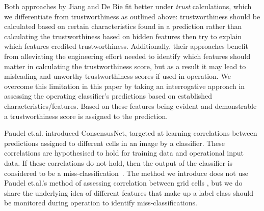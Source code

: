 Both approaches by Jiang and De Bie fit better under \textit{trust} calculations, which we differentiate from trustworthiness as outlined above: trustworthiness should be calculated based on certain characteristics found in a prediction rather than calculating the trustworthiness based on hidden features then try to explain which features credited trustworthiness. 
%
Additionally, their approaches benefit from alleviating the engineering effort needed to identify which features should matter in calculating the trustworthiness score, but as a result it may lead to misleading and unworthy trustworthiness scores if used in operation.
%
%
We overcome this limitation in this paper by taking an interrogative approach in assessing the operating classifier's predictions based on established characteristics/features. 
Based on these features being evident and demonstrable a trustworthiness score is assigned to the prediction.
%
%

Paudel et.al. introduced ConsensusNet, targeted at learning correlations between predictions assigned to different cells in an image by a classifier. %
%
These correlations are hypothesised to hold for training data and operational input data. If these correlations do not hold, then the output of the classifier is considered to be a miss-classification~\cite{Paudel2021}. 
%
The method we introduce
does not use Paudel et.al.'s method of assessing correlation between grid cells
, but we do share the underlying idea of different features that make up a label class should be monitored during operation to identify miss-classifications.

